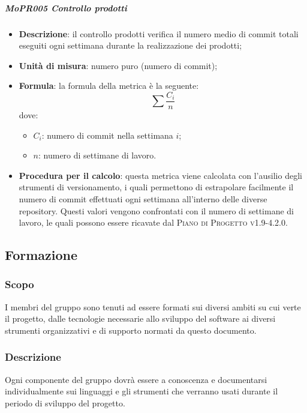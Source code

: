 \subparagraph{MoPR005 Controllo prodotti}
\begin{itemize}
  \item \textbf{Descrizione}: il controllo prodotti verifica il numero medio di commit totali eseguiti ogni settimana durante la realizzazione dei prodotti;
  \item \textbf{Unità di misura}: numero puro (numero di commit);
  \item \textbf{Formula}: la formula della metrica è la seguente:
  \begin{displaymath}
    \sum \frac{C_i}{n}
  \end{displaymath}
  dove:
  \begin{itemize}
    \item $ C_i $: numero di commit nella settimana $ i $;
    \item $ n $: numero di settimane di lavoro.
  \end{itemize}
  \item \textbf{Procedura per il calcolo}: questa metrica viene calcolata con l'ausilio degli strumenti di versionamento, i quali permettono di estrapolare facilmente il numero di commit effettuati ogni settimana all'interno delle diverse repository. Questi valori vengono confrontati con il numero di settimane di lavoro, le quali possono essere ricavate dal \textsc{Piano di Progetto v1.9-4.2.0}.
\end{itemize}

\subsection{Formazione}
\subsubsection{Scopo}
I membri del gruppo sono tenuti ad essere formati sui diversi ambiti su cui verte il progetto, dalle tecnologie necessarie allo sviluppo del software ai diversi strumenti organizzativi e di supporto normati da questo documento.

\subsubsection{Descrizione}
Ogni componente del gruppo dovrà essere a conoscenza e documentarsi individualmente sui linguaggi e gli strumenti che verranno usati durante il periodo di sviluppo del progetto.


